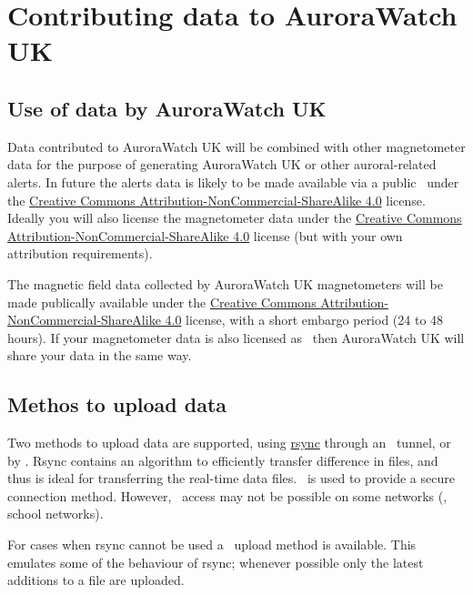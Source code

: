 \chapter{Contributing data to AuroraWatch UK}

\section{Use of data by AuroraWatch UK }

Data contributed to AuroraWatch UK will be combined with other
magnetometer data for the purpose of generating AuroraWatch UK or
other auroral-related alerts. In future the alerts data is likely to
be made available via a public \api\ under the
\href{\ccByNcSaFourUrl}{Creative Commons
  Attribution-NonCommercial-ShareAlike 4.0} license. Ideally you will
also license the magnetometer data under the
\href{\ccByNcSaFourUrl}{Creative Commons
  Attribution-NonCommercial-ShareAlike 4.0} license (but with your own
attribution requirements).


The magnetic field data collected by AuroraWatch UK magnetometers will
be made publically available under the
\href{\ccByNcSaFourUrl}{Creative Commons
  Attribution-NonCommercial-ShareAlike 4.0} license, with a short
embargo period (24 to 48 hours). If your magnetometer data is also
licensed as \ccByNcSaFour\ then AuroraWatch UK will share your data in
the same way.

\section{Methos to upload data}
Two methods to upload data are supported, using
\href{\rsyncUrl}{rsync} through an \ssh\ tunnel, or by \http. Rsync
contains an algorithm to efficiently transfer difference in files, and
thus is ideal for transferring the real-time data files. \ssh\ is used
to provide a secure connection method. However, \ssh\ access may not
be possible on some networks (\eg, school networks). 

For cases when rsync cannot be used a \http\ upload method is
available. This emulates some of the behaviour of rsync; whenever
possible only the latest additions to a file are uploaded.



